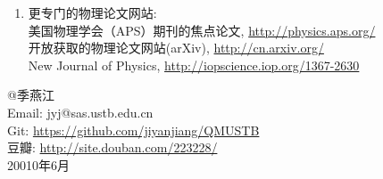 \begin{enumerate}
{%

}

\item{更专门的物理论文网站:
\\美国物理学会（APS）期刊的焦点论文,
\url{http://physics.aps.org/}
\\开放获取的物理论文网站(arXiv),
\url{http://cn.arxiv.org/} 
\\New Journal of Physics,
\url{http://iopscience.iop.org/1367-2630}

}

\end{enumerate}


\bigskip\medskip

\noindent
@季燕江\\

Email: jyj@sas.ustb.edu.cn\\
Git: \url{https://github.com/jiyanjiang/QMUSTB}\\
豆瓣: \url{http://site.douban.com/223228/}\\

20010年6月